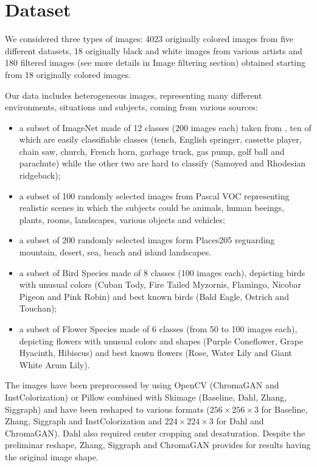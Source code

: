 \section{Dataset}
We considered three types of images: 4023 originally colored images from five different datasets, 18 originally black and white images from various artists and 180 filtered images (see more details in Image filtering section) obtained starting from 18 originally colored images.

Our data includes heterogeneous images, representing many different environments, situations and subjects, coming from various sources:
\begin{itemize}
	\item a subset of ImageNet made of 12 classes (200 images each) taken from \cite{imagenette}, ten of which are easily classifiable classes (tench, English springer, cassette player, chain saw, church, French horn, garbage truck, gas pump, golf ball and parachute) while the other two are hard to classify (Samoyed and Rhodesian ridgeback);
	\item a subset of 100 randomly selected images from Pascal VOC \cite{pascal} representing realistic scenes in which the subjects could be animals, human beeings, plants, rooms, landscapes, various objects and vehicles;
	\item a subset of 200 randomly selected images form Places205 \cite{place} reguarding mountain, desert, sea, beach and island landscapes.
	\item a subset of Bird Species \cite{bird} made of 8 classes (100 images each), depicting birds with unusual colors (Cuban Tody, Fire Tailed Myzornis, Flamingo, Nicobar Pigeon and Pink Robin) and best known birds (Bald Eagle, Ostrich and Touchan);
	\item a subset of Flower Species \cite{flower} made of 6 classes (from 50 to 100 images each), depicting flowers with unusual colors and shapes (Purple Coneflower, Grape Hyacinth, Hibiscus) and best known flowers (Rose, Water Lily and Giant White Arum Lily).
\end{itemize}

The images have been preprocessed by using OpenCV (ChromaGAN and InstColorization) or Pillow combined with Skimage
(Baseline, Dahl, Zhang, Siggraph) and have been reshaped to various formats ($256\times256\times3$ for Baseline, Zhang, Siggraph and InstColorization and $224\times224\times3$ for Dahl and ChromaGAN). Dahl also required center cropping and desaturation. Despite the preliminar reshape, Zhang, Siggraph and ChromaGAN provides for results having the original image shape.

